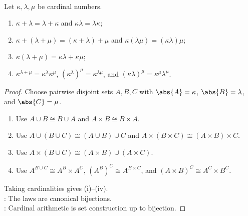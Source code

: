 \begin{proposition} \label{prop:cardinal-arithmetic-reference-laws} \\
Let $\kappa,\lambda,\mu$ be cardinal numbers.
\begin{enumerate}[label=(\roman*)]
\setlength{\itemsep}{0pt}
\item $\kappa+\lambda=\lambda+\kappa$ and $\kappa\lambda=\lambda\kappa$;
\item $\kappa+(\lambda+\mu)=(\kappa+\lambda)+\mu$ and $\kappa(\lambda\mu)=(\kappa\lambda)\mu$;
\item $\kappa(\lambda+\mu)=\kappa\lambda+\kappa\mu$;
\item $\kappa^{\lambda+\mu}=\kappa^\lambda\kappa^\mu$, $(\kappa^\lambda)^\mu=\kappa^{\lambda\mu}$, and $(\kappa\lambda)^\mu=\kappa^\mu\lambda^\mu$.
\end{enumerate}
\begin{proof}
Choose pairwise disjoint sets $A,B,C$ with $\abs{A}=\kappa$, $\abs{B}=\lambda$, and $\abs{C}=\mu$.
\begin{enumerate}[label=(\roman*)]
\setlength{\itemsep}{0pt}
\item Use $A\cup B\cong B\cup A$ and $A\times B\cong B\times A$.
\item Use $A\cup(B\cup C)\cong(A\cup B)\cup C$ and $A\times(B\times C)\cong(A\times B)\times C$.
\item Use $A\times(B\cup C)\cong(A\times B)\cup(A\times C)$.
\item Use $A^{B\cup C}\cong A^B\times A^C$, $(A^B)^C\cong A^{B\times C}$, and $(A\times B)^C\cong A^C\times B^C$.
\end{enumerate}
Taking cardinalities gives (i)--(iv).\\
: The laws are canonical bijections.\\
: Cardinal arithmetic is set construction up to bijection.
\end{proof}
\end{proposition}

